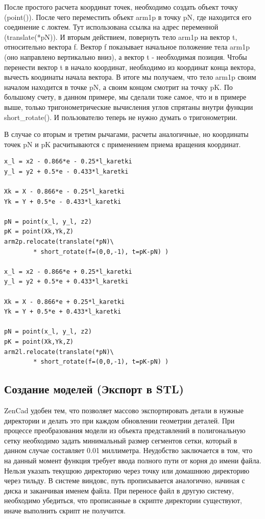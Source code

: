После простого расчета координат точек, необходимо создать объект точку (point()). После чего переместить объект arm1p в точку pN, где находится его соединение с локтем. Тут использована ссылка на адрес переменной (translate(*pN)).  И вторым действием, повернуть тело arm1p на вектор t, относительно вектора f. Вектор f показывает начальное положение тела arm1p (оно направлено вертикально вниз), а вектор t - необходимая позиция. Чтобы перенести вектор t в начало координат, необходимо из координат конца вектора, вычесть коодинаты начала вектора. В итоге мы получаем, что тело arm1p своим началом находится в точке pN, а своим концом смотрит на точку pK. По большому счету, в данном примере, мы сделали тоже самое, что и в примере выше, только тригонометрические вычисления углов спрятаны внутри функции short\_rotate(). И пользователю теперь не нужно думать о тригонометрии.

В случае со вторым и третим рычагами, расчеты аналогичные, но координаты точек pN и pK расчитываются с применением приема вращения координат. 

\begin{lstlisting}[style=python,caption=Векторный поворот второго шарнира]
x_l = x2 - 0.866*e - 0.25*l_karetki
y_l = y2 + 0.5*e - 0.433*l_karetki

Xk = X - 0.866*e - 0.25*l_karetki
Yk = Y + 0.5*e - 0.433*l_karetki

pN = point(x_l, y_l, z2)
pK = point(Xk,Yk,Z)
arm2p.relocate(translate(*pN)\
        * short_rotate(f=(0,0,-1), t=pK-pN) )

x_l = x2 - 0.866*e + 0.25*l_karetki
y_l = y2 + 0.5*e + 0.433*l_karetki

Xk = X - 0.866*e + 0.25*l_karetki
Yk = Y + 0.5*e + 0.433*l_karetki

pN = point(x_l, y_l, z2)
pK = point(Xk,Yk,Z)
arm2l.relocate(translate(*pN)\
        * short_rotate(f=(0,0,-1), t=pK-pN) )
\end{lstlisting}

\subsection{Создание моделей (Экспорт в STL)}

ZenCad удобен тем, что позволяет массово экспортировать детали в нужные директории и делать это при каждом обновлении геометрии деталей. При процессе преобразования модели из объекта представлений в полигональную сетку необходимо задать минимальный размер сегментов сетки, который в данном случае составляет 0.01 миллиметра. Неудобство заключается в том, что на данный момент функция требует ввода полного пути от корня до имени файла. Нельзя указать текущюю директорию через точку или домашнюю директорию через тильду. В системе виндовс, путь прописывается аналогично, начиная с диска и заканчивая именем файла. При переносе файл в другую систему, необходимо убедиться, что прописанные в скрипте директории существуют, иначе выполнить скрипт не получится. 

